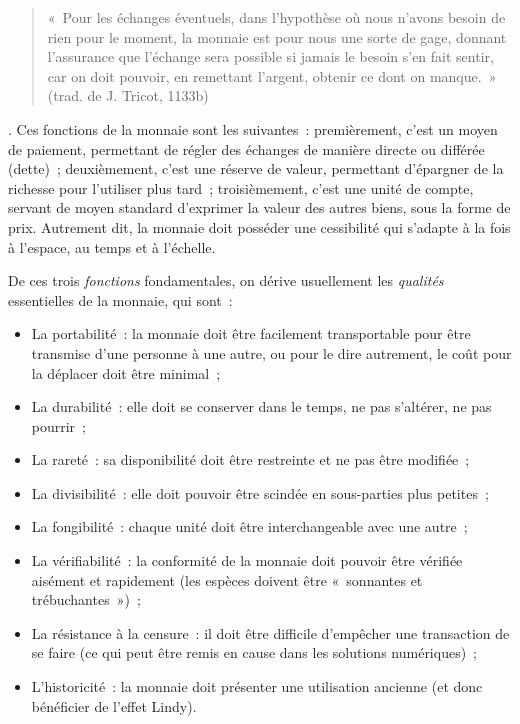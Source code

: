 {\begin{quote}
\footnotesize «~Pour les échanges éventuels, dans l'hypothèse où nous n'avons besoin de rien pour le moment, la monnaie est pour nous une sorte de gage, donnant l'assurance que l'échange sera possible si jamais le besoin s'en fait sentir, car on doit pouvoir, en remettant l'argent, obtenir ce dont on manque.~»  (trad. de J. Tricot, 1133b)
\end{quote}}. Ces fonctions de la monnaie sont les suivantes~: premièrement, c'est un moyen de paiement, permettant de régler des échanges de manière directe ou différée (dette)~; deuxièmement, c'est une réserve de valeur, permettant d'épargner de la richesse pour l'utiliser plus tard~; troisièmement, c'est une unité de compte, servant de moyen standard d'exprimer la valeur des autres biens, sous la forme de prix. Autrement dit, la monnaie doit posséder une cessibilité qui s'adapte à la fois à l'espace, au temps et à l'échelle.

De ces trois \emph{fonctions} fondamentales, on dérive usuellement les \emph{qualités} essentielles de la monnaie, qui sont~:

\begin{itemize}
\item La portabilité~: la monnaie doit être facilement transportable pour être transmise d'une personne à une autre, ou pour le dire autrement, le coût pour la déplacer doit être minimal~;
\item La durabilité~: elle doit se conserver dans le temps, ne pas s'altérer, ne pas pourrir~;
\item La rareté~: sa disponibilité doit être restreinte et ne pas être modifiée~;
\item La divisibilité~: elle doit pouvoir être scindée en sous-parties plus petites~;
\item La fongibilité~: chaque unité doit être interchangeable avec une autre~;
\item La vérifiabilité~: la conformité de la monnaie doit pouvoir être vérifiée aisément et rapidement (les espèces doivent être «~sonnantes et trébuchantes~»)~;
\item La résistance à la censure~: il doit être difficile d'empêcher une transaction de se faire (ce qui peut être remis en cause dans les solutions numériques)~;
\item L'historicité~: la monnaie doit présenter une utilisation ancienne (et donc bénéficier de l'effet Lindy).
\end{itemize}

